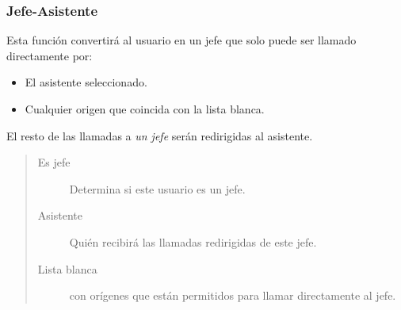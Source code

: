 \documentclass[letterpaper,10pt,spanish]{sphinxmanual}
\begin{document}
\subsubsection{Jefe-Asistente}
\label{administration_portal/client/vpbx/users:boss-assistant}
Esta función convertirá al usuario en un jefe que solo puede ser llamado directamente por:
\begin{itemize}
\item {} 
El asistente seleccionado.

\item {} 
Cualquier origen que coincida con la lista blanca.

\end{itemize}

El resto de las llamadas a \emph{un jefe} serán redirigidas al asistente.
\begin{quote}
\begin{description}
\item[{Es jefe}] \leavevmode
Determina si este usuario es un jefe.

\item[{Asistente}] \leavevmode
Quién recibirá las llamadas redirigidas de este jefe.

\item[{Lista blanca}] \leavevmode
{\hyperref[administration_portal/client/vpbx/routing_tools/match_lists:match\string-lists]{}} con orígenes que están permitidos para llamar directamente al jefe.

\end{description}
\end{quote}
\end{document}
